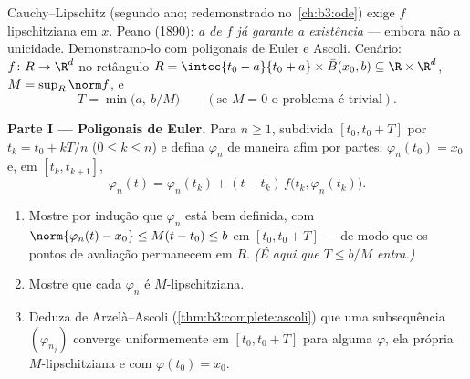\begin{problem}[{Problema de fim de semana --- existência de soluções
de $x' = f(t, x)$ sem Lipschitz}]\label{pb:b3:complete:1}
Cauchy--Lipschitz (segundo ano; redemonstrado no~\cref{ch:b3:ode}) exige
$f$ lipschitziana em $x$. Peano (1890): \emph{a  de
$f$ já garante a existência} --- embora não a unicidade.
Demonstramo-lo com poligonais de Euler e Ascoli. Cenário: $f \colon R
\to \R^d$
 no retângulo $R = \intcc{t_0 - a}{t_0
+ a}\times \bar B(x_0, b) \subseteq \R\times\R^d$, $M =
\sup_R\norm f$, e
\[
T = \min\bigl(a,\ b/M\bigr)
\qquad (\text{se } M = 0 \text{ o problema é trivial}).
\]

\medskip
\noindent\textbf{Parte I --- Poligonais de Euler.} Para $n \geq 1$,
subdivida $[t_0, t_0 + T]$ por $t_k = t_0 + kT/n$ ($0 \leq k
\leq n$) e defina $\varphi_n$ de maneira afim por
partes: $\varphi_n(t_0) = x_0$ e, em $[t_k, t_{k+1}]$,
\[
\varphi_n(t) = \varphi_n(t_k) + (t -
t_k)\,f\bigl(t_k, \varphi_n(t_k)\bigr).
\]
\begin{enumerate}
  \item Mostre por indução que $\varphi_n$ está bem definida, com $\norm{\varphi_n(t) - x_0} \leq M(t - t_0) \leq b$ em
        $[t_0, t_0 + T]$ --- de modo que os pontos de avaliação permanecem em
        $R$. \emph{(É aqui que $T \leq b/M$ entra.)}
  \item Mostre que cada $\varphi_n$ é $M$-lipschitziana.
  \item Deduza de Arzelà--Ascoli (\cref{thm:b3:complete:ascoli}) que uma subsequência
        $(\varphi_{n_j})$ converge uniformemente em $[t_0, t_0 +
        T]$ para alguma $\varphi$, ela
        própria $M$-lipschitziana e com $\varphi(t_0) = x_0$.
\end{enumerate}


\end{problem}
